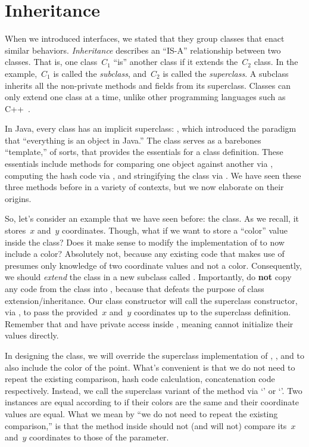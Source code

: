 \section{Inheritance}

When we introduced interfaces, we stated that they group classes that enact similar behaviors. 
\emph{Inheritance} describes an ``IS-A'' relationship between two classes. 
That is, one class~$C_1$ ``is'' another class if it extends the~$C_2$ class. 
In the example,~$C_1$ is called the \emph{subclass}, and~$C_2$ is called the \emph{superclass}. 
A subclass inherits all the non-private methods and fields from its superclass. 
Classes can only extend one class at a time, unlike other programming languages such as C++~\citep{cpp}. 

In Java, every class has an implicit superclass: , which introduced the paradigm that ``everything is an object in Java.'' 
The  class serves as a barebones ``template,'' of sorts, that provides the essentials for a class definition. 
These essentials include methods for comparing one object against another via , computing the hash code via , and stringifying the class via . 
We have seen these three methods before in a variety of contexts, but we now elaborate on their origins.

So, let's consider an example that we have seen before: the  class. As we recall, it stores~$x$ and~$y$ coordinates. 
Though, what if we want to store a ``color'' value inside the  class? 
Does it make sense to modify the implementation of  to now include a color? 
Absolutely not, because any existing code that makes use of  presumes only knowledge of two coordinate values and not a color. 
Consequently, we should \emph{extend} the  class in a new subclass called . 
Importantly, do \textbf{not} copy any code from the  class into , because that defeats the purpose of class extension/inheritance. 
Our  class constructor will call the superclass constructor, via , to pass the provided~$x$ and~$y$ coordinates up to the superclass definition. 
Remember that  and  have private access inside , meaning  cannot initialize their values directly.

In designing the  class, we will override the superclass implementation of , , and  to also include the color of the point. 
What's convenient is that we do not need to repeat the existing comparison, hash code calculation, concatenation code respectively. 
Instead, we call the superclass variant of the method via `' or `'. 
Two  instances are equal according to  if their colors are the same and their coordinate values are equal. 
What we mean by ``we do not need to repeat the existing comparison,'' is that the  method inside  should not (and will not) compare its~$x$ and~$y$ coordinates to those of the parameter.

